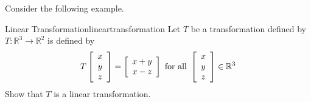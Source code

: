 Consider the following example.

\begin{example}{Linear Transformation}{lineartransformation}
Let $T$ be a transformation defined by
$T:\mathbb{R}^3\to\mathbb{R}^2$ is defined by
\[
T\left[\begin{array}{c} x \\ y \\ z \end{array}\right]
= 
\left[\begin{array}{c} x+y \\ x-z \end{array}\right]
\mbox{ for all }
\left[\begin{array}{c} x \\ y \\ z \end{array}\right] \in\mathbb{R}^3
\]
Show that $T$ is a linear transformation.
\end{example}

